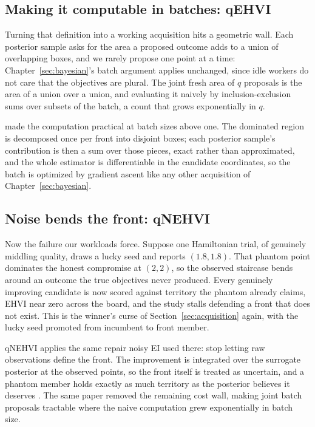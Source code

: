 \subsection{Making it computable in batches: qEHVI}

Turning that definition into a working acquisition hits a geometric
wall. Each posterior sample asks for the area a proposed outcome adds
to a union of overlapping boxes, and we rarely propose one point at a
time: Chapter~\ref{sec:bayesian}'s batch argument applies unchanged,
since idle workers do not care that the objectives are plural. The
joint fresh area of $q$ proposals is the area of a union over a
union, and evaluating it naively by inclusion-exclusion sums over
subsets of the batch, a count that grows exponentially in $q$.

\citet{daulton2020qehvi} made the computation practical at batch
sizes above one. The dominated region is decomposed once per front
into disjoint boxes; each posterior sample's contribution is then a
sum over those pieces, exact rather than approximated, and the whole
estimator is differentiable in the candidate coordinates, so the
batch is optimized by gradient ascent like any other acquisition of
Chapter~\ref{sec:bayesian}.

\subsection{Noise bends the front: qNEHVI}

Now the failure our workloads force. Suppose one Hamiltonian trial,
of genuinely middling quality, draws a lucky seed and reports
$(1.8, 1.8)$. That phantom point dominates the honest compromise at
$(2,2)$, so the observed staircase bends around an outcome the true
objectives never produced. Every genuinely improving candidate is now
scored against territory the phantom already claims, EHVI near zero
across the board, and the study stalls defending a front that does
not exist. This is the winner's curse of
Section~\ref{sec:acquisition} again, with the lucky seed promoted
from incumbent to front member.

qNEHVI applies the same repair noisy EI used there: stop letting raw
observations define the front. The improvement is integrated over the
surrogate posterior at the observed points, so the front itself is
treated as uncertain, and a phantom member holds exactly as much
territory as the posterior believes it deserves
\citep{daulton2021qnehvi}. The same paper removed the remaining cost
wall, making joint batch proposals tractable where the naive
computation grew exponentially in batch size.


